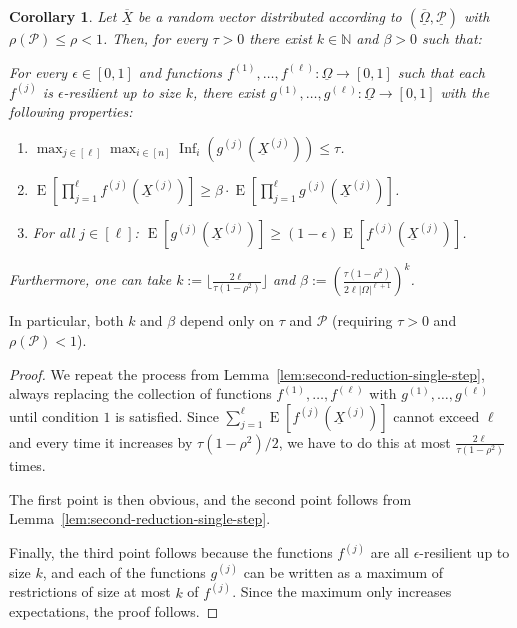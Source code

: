 \documentclass{daj}
\newcommand{\1}{\mathbbm{1}}
\theoremstyle{plain}
\newtheorem{corollary}[theorem]{Corollary}
\theoremstyle{definition}
\DeclareMathOperator*{\EE}{E}
\DeclareMathOperator{\Inf}{Inf}
\begin{document}
\begin{corollary}
\label{cor:low-influence-reduction}
Let $\overline{\underline{X}}$ be a random vector distributed according
to $(\overline{\underline{\Omega}}, \underline{\mathcal{P}})$ with 
$\rho(\mathcal{P}) \le \rho < 1$.
Then, for every $\tau > 0$ there exist $k \in \mathbb{N}$ and 
$\beta > 0$ such that:

For every $\epsilon \in [0, 1]$ and functions
$f^{(1)}, \ldots, f^{(\ell)}: \underline{\Omega} \to [0, 1]$ such that each
$f^{(j)}$ is $\epsilon$-resilient up to size $k$, there exist
$g^{(1)}, \ldots, g^{(\ell)}: \underline{\Omega} \to [0, 1]$
with the following properties:
\begin{enumerate}
\item
  $\max_{j \in [\ell]} \max_{i \in [n]} \Inf_i(g^{(j)}(\underline{X}^{(j)}))
  \leq \tau$.
\item $\EE \left[ \prod_{j=1}^{\ell} f^{(j)}(\underline{X}^{(j)}) \right] \ge 
\beta \cdot 
\EE \left[ \prod_{j=1}^{\ell} g^{(j)}(\underline{X}^{(j)}) \right]$.
\item For all $j \in [\ell]$:
  $\EE[g^{(j)}(\underline{X}^{(j)})] \geq 
  (1-\epsilon)\EE[f^{(j)}(\underline{X}^{(j)})]$.
\end{enumerate}
Furthermore, one can take $k := \lfloor \frac{2\ell}{\tau(1-\rho^2)} \rfloor$
and $\beta := \left(\frac{\tau(1-\rho^2)}{2\ell|\Omega|^{\ell+1}}\right)^k$.
\end{corollary}
In particular, both $k$ and $\beta$ depend only on $\tau$ and $\mathcal{P}$
(requiring $\tau > 0$ and $\rho(\mathcal{P}) < 1$).
\begin{proof}
We repeat the process from Lemma~\ref{lem:second-reduction-single-step},
always replacing the collection of functions $f^{(1)},\ldots,f^{(\ell)}$
with $g^{(1)},\ldots,g^{(\ell)}$ until condition $1$ is satisfied.
Since $\sum_{j=1}^{\ell} \EE[f^{(j)}(\underline{X}^{(j)})]$ cannot exceed $\ell$
and every time it increases by $\tau(1-\rho^2)/2$, we have to do this at most
$\frac{2 \ell}{ \tau (1-\rho^2)}$ times.

The first point is then obvious, and the second point follows
from Lemma~\ref{lem:second-reduction-single-step}.

Finally, the third point follows 
because the functions $f^{(j)}$ are all $\epsilon$-resilient up to size
$k$, and each of the functions $g^{(j)}$ can be written as 
a maximum of restrictions
of size at most $k$ of $f^{(j)}$. Since the maximum only increases expectations, the proof follows. 
\end{proof}
\end{document}
